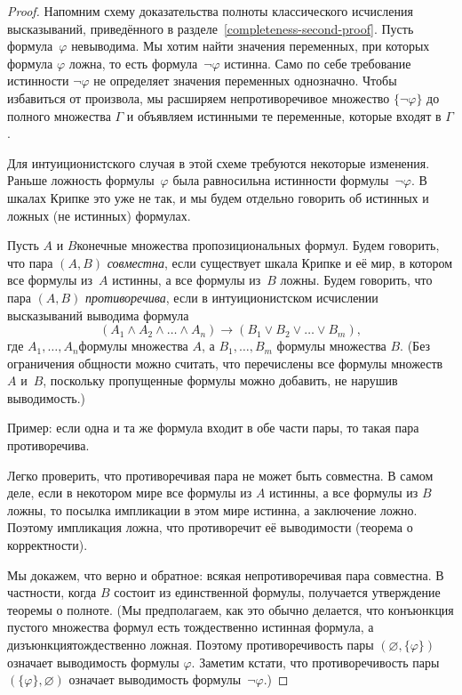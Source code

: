 \begin{proof}
Напомним схему доказательства полноты классического исчисления
высказываний, приведённого в
разделе~\ref{completeness-second-proof}. Пусть формула~$\varphi$
невыводима. Мы хотим найти значения переменных, при которых
формула $\varphi$ ложна, то есть формула~$\lnot\varphi$ истинна.
Само по себе требование истинности $\lnot\varphi$ не определяет
значения переменных однозначно. Чтобы избавиться от произвола,
мы расширяем непротиворечивое множество $\{\lnot\varphi\}$ до
полного множества $\Gamma$ и объявляем истинными те переменные,
которые входят в $\Gamma$.

Для интуиционистского случая в этой схеме требуются некоторые
изменения. Раньше ложность формулы~$\varphi$ была равносильна
истинности формулы~$\lnot\varphi$. В шкалах Крипке это уже не
так, и мы будем отдельно говорить об истинных и ложных (не
истинных) формулах.

Пусть $A$ и $B$\т конечные множества пропозициональных формул.
Будем говорить, что пара $(A,B)$ \emph{совместна},%
%
если
существует шкала Крипке и её мир, в котором все формулы из~$A$
истинны, а все формулы из~$B$ ложны. Будем говорить, что пара
$(A,B)$ \emph{противоречива},%
%
если в интуиционистском исчислении
высказываний выводима формула
        $$
(A_1 \land A_2 \land\ldots\land A_n) \to
(B_1 \lor B_2 \lor\ldots\lor B_m),
        $$
где $A_1,\dots,A_n$\т формулы множества $A$, а $B_1,\dots,B_m$\т
формулы множества $B$. (Без ограничения общности можно считать,
что перечислены все формулы множеств~$A$ и~$B$, поскольку
пропущенные формулы можно добавить, не нарушив выводимость.)

Пример: если одна и та же формула входит в обе части пары, то
такая пара противоречива.

Легко проверить, что противоречивая пара не может быть
совместна. В самом деле, если в некотором мире все формулы из
$A$ истинны, а все формулы из $B$ ложны, то посылка импликации в
этом мире истинна, а заключение ложно. Поэтому импликация ложна,
что противоречит её выводимости (теорема о корректности).

Мы докажем, что верно и обратное: всякая непротиворечивая пара
совместна. В частности, когда $B$ состоит из единственной
формулы, получается утверждение теоремы о полноте. (Мы
предполагаем, как это обычно делается, что конъюнкция пустого
множества формул есть тождественно истинная формула, а
дизъюнкция\т тождественно ложная. Поэтому противоречивость пары
$(\varnothing,\{\varphi\})$ означает выводимость формулы
$\varphi$. Заметим кстати, что противоречивость пары
$(\{\varphi\},\varnothing)$ означает выводимость
формулы~$\lnot\varphi$.)


\end{proof}
